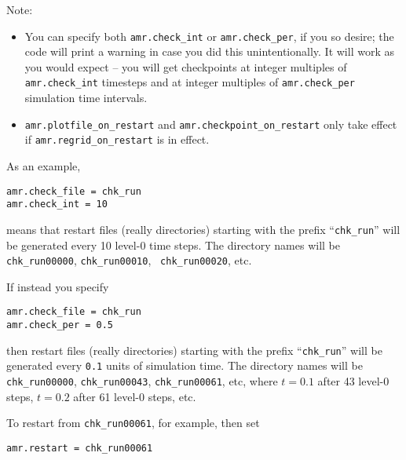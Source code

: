 Note:
\begin{itemize}

\item You can specify both {\tt amr.check\_int} or {\tt amr.check\_per},
  if you so desire; the code will print a warning in case you did this
  unintentionally. It will work as you would expect -- you will get checkpoints
  at integer multiples of {\tt amr.check\_int} timesteps and at integer
  multiples of {\tt amr.check\_per} simulation time intervals.

\item {\tt amr.plotfile\_on\_restart} and {\tt amr.checkpoint\_on\_restart} 
only take effect if {\tt amr.regrid\_on\_restart} is in effect.
\end{itemize}

As an example,
\begin{lstlisting}
amr.check_file = chk_run
amr.check_int = 10
\end{lstlisting}
means that restart files (really directories) starting with the prefix
``{\tt chk\_run}'' will be generated every 10 level-0 time steps.  The
directory names will be {\tt chk\_run00000}, {\tt chk\_run00010}, {\tt
chk\_run00020}, etc.

If instead you specify
\begin{lstlisting}
amr.check_file = chk_run
amr.check_per = 0.5
\end{lstlisting}
then restart files (really directories) starting with the prefix
``{\tt chk\_run}'' will be generated every {\tt 0.1} units of
simulation time.  The directory names will be {\tt chk\_run00000},
{\tt chk\_run00043}, {\tt chk\_run00061}, etc, where $t = 0.1$ after
43 level-0 steps, $t = 0.2$ after 61 level-0 steps, etc.


To restart from {\tt chk\_run00061}, for example, then set 
\begin{lstlisting}
amr.restart = chk_run00061
\end{lstlisting}


